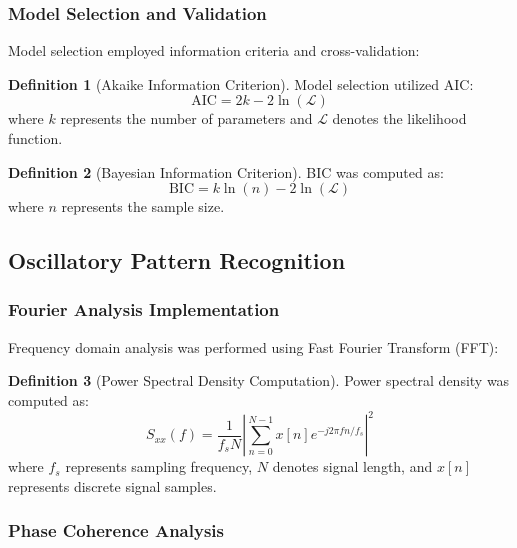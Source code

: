 \documentclass[12pt,a4paper]{article}
\theoremstyle{definition}
\newtheorem{definition}{Definition}[section]
\begin{document}
\subsubsection{Model Selection and Validation}

Model selection employed information criteria and cross-validation:

\begin{definition}[Akaike Information Criterion]
Model selection utilized AIC:
\begin{equation}
\text{AIC} = 2k - 2\ln(\mathcal{L})
\end{equation}
where $k$ represents the number of parameters and $\mathcal{L}$ denotes the likelihood function.
\end{definition}

\begin{definition}[Bayesian Information Criterion]
BIC was computed as:
\begin{equation}
\text{BIC} = k\ln(n) - 2\ln(\mathcal{L})
\end{equation}
where $n$ represents the sample size.
\end{definition}

\subsection{Oscillatory Pattern Recognition}

\subsubsection{Fourier Analysis Implementation}

Frequency domain analysis was performed using Fast Fourier Transform (FFT):

\begin{definition}[Power Spectral Density Computation]
Power spectral density was computed as:
\begin{equation}
S_{xx}(f) = \frac{1}{f_s N} \left| \sum_{n=0}^{N-1} x[n] e^{-j2\pi fn/f_s} \right|^2
\end{equation}
where $f_s$ represents sampling frequency, $N$ denotes signal length, and $x[n]$ represents discrete signal samples.
\end{definition}

\subsubsection{Phase Coherence Analysis}
\end{document}
